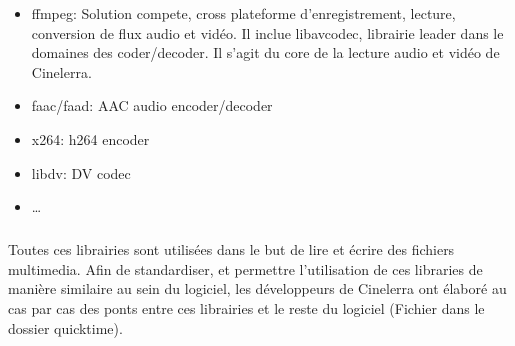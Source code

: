 \begin{itemize}

  \item{ffmpeg: Solution compete, cross plateforme
  d'enregistrement, lecture, conversion de flux audio et vidéo. Il
  inclue libavcodec, librairie leader dans le domaines des
  coder/decoder.
Il s'agit du core de la
  lecture audio et vidéo de Cinelerra.}

  \item{faac/faad: AAC audio encoder/decoder}

  \item{x264: h264 encoder}

  \item{libdv: DV codec}

  \item{\ldots}

\end{itemize}

\subparagraph{}

Toutes ces librairies sont utilisées dans le but de lire et écrire des
fichiers multimedia. Afin de standardiser, et permettre l'utilisation de
ces libraries de manière similaire au sein du logiciel, les développeurs
de Cinelerra ont élaboré au cas par cas des ponts entre ces librairies
et le reste du logiciel (Fichier dans le dossier quicktime).

\subparagraph{}







